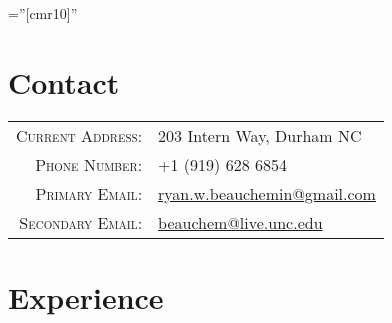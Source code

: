 \documentclass[a4paper,10pt]{article} %
\begin{document}
\pagestyle{empty} %

\font\fb=''[cmr10]'' %

\par{\par\bigskip}

\section{Contact} %

\begin{tabular}{rl}
\textsc{Current Address:} & 203 Intern Way, Durham NC \\
\textsc{Phone Number:} & +1 (919) 628 6854\\
\textsc{Primary Email:} & \href{mailto:ryan.w.beauchemin@gmail.com}{ryan.w.beauchemin@gmail.com}\\
\textsc{Secondary Email:} & \href{mailto:beauchem@live.unc.edu}{beauchem@live.unc.edu}\\
\end{tabular}
\bigskip


\section{Experience} %
\end{document}
